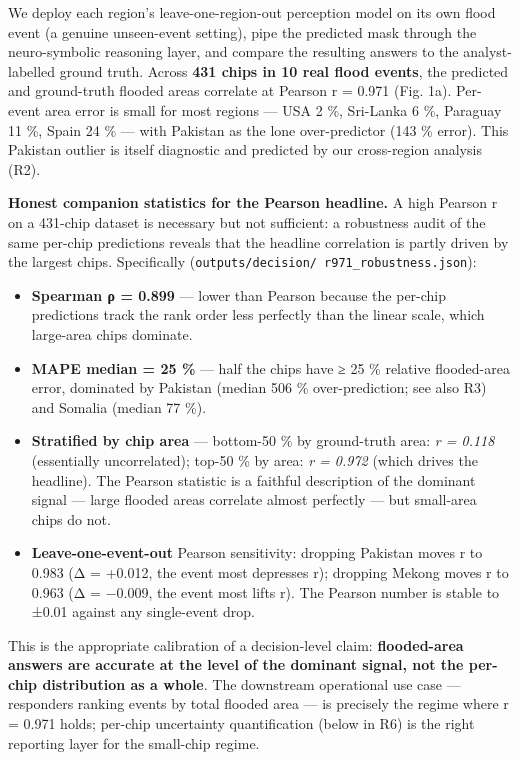 We deploy each region's leave-one-region-out perception model on its own flood
event (a genuine unseen-event setting), pipe the predicted mask through the
neuro-symbolic reasoning layer, and compare the resulting answers to the
analyst-labelled ground truth. Across \textbf{431 chips in 10 real flood events},
the predicted and ground-truth flooded areas correlate at Pearson r = 0.971
(Fig. 1a). Per-event area error is small for most regions --- USA 2 \%,
Sri-Lanka 6 \%, Paraguay 11 \%, Spain 24 \% --- with Pakistan as the lone
over-predictor (143 \% error). This Pakistan outlier is itself diagnostic and
predicted by our cross-region analysis (R2).

\textbf{Honest companion statistics for the Pearson headline.} A high Pearson r
on a 431-chip dataset is necessary but not sufficient: a robustness audit
of the same per-chip predictions reveals that the headline correlation is
partly driven by the largest chips. Specifically (\texttt{outputs/decision/\ r971\_robustness.json}):

\begin{itemize}
\tightlist
\item
  \textbf{Spearman ρ = 0.899} --- lower than Pearson because the per-chip
  predictions track the rank order less perfectly than the linear scale,
  which large-area chips dominate.
\item
  \textbf{MAPE median = 25 \%} --- half the chips have ≥ 25 \% relative
  flooded-area error, dominated by Pakistan (median 506 \% over-prediction;
  see also R3) and Somalia (median 77 \%).
\item
  \textbf{Stratified by chip area} --- bottom-50 \% by ground-truth area:
  \emph{r = 0.118} (essentially uncorrelated); top-50 \% by area: \emph{r = 0.972}
  (which drives the headline). The Pearson statistic is a faithful
  description of the dominant signal --- large flooded areas correlate
  almost perfectly --- but small-area chips do not.
\item
  \textbf{Leave-one-event-out} Pearson sensitivity: dropping Pakistan moves r
  to 0.983 (Δ = +0.012, the event most depresses r); dropping Mekong
  moves r to 0.963 (Δ = −0.009, the event most lifts r). The Pearson
  number is stable to ±0.01 against any single-event drop.
\end{itemize}

This is the appropriate calibration of a decision-level claim:
\textbf{flooded-area answers are accurate at the level of the dominant signal,
not the per-chip distribution as a whole}. The downstream operational
use case --- responders ranking events by total flooded area --- is precisely
the regime where r = 0.971 holds; per-chip uncertainty quantification
(below in R6) is the right reporting layer for the small-chip regime.

